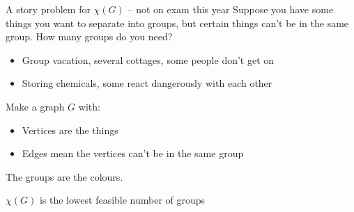 \documentclass{beamer}
\begin{document}
\begin{frame}{A story problem for $\chi(G)$ -- not on exam this year}
  Suppose you have some things you want to separate into groups, but certain things can't be in the same group.  How many groups do you need?
  \begin{itemize}
  \item Group vacation, several cottages, some people don't get on
  \item Storing chemicals, some react dangerously with each other
    \end{itemize}
\begin{block}{Make a graph $G$ with:}
  \begin{itemize}
  \item Vertices are the things
  \item Edges mean the vertices can't be in the same group
  \end{itemize}
  The groups are the colours.
\end{block}
\begin{block}{$\chi(G)$ is the lowest feasible number of groups}
  \end{block}
  


  \end{frame}
\end{document}
